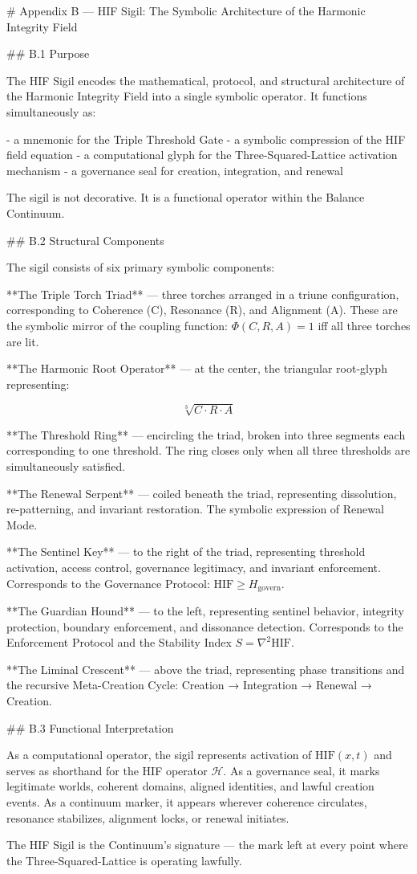 # Appendix B — HIF Sigil: The Symbolic Architecture of the Harmonic Integrity Field

## B.1 Purpose

The HIF Sigil encodes the mathematical, protocol, and structural architecture of
the Harmonic Integrity Field into a single symbolic operator. It functions
simultaneously as:

- a mnemonic for the Triple Threshold Gate
- a symbolic compression of the HIF field equation
- a computational glyph for the Three-Squared-Lattice activation mechanism
- a governance seal for creation, integration, and renewal

The sigil is not decorative. It is a functional operator within the Balance
Continuum.

## B.2 Structural Components

The sigil consists of six primary symbolic components:

**The Triple Torch Triad** — three torches arranged in a triune configuration,
corresponding to Coherence (C), Resonance (R), and Alignment (A). These are the
symbolic mirror of the coupling function: \(\Phi(C,R,A) = 1\) iff all three
torches are lit.

**The Harmonic Root Operator** — at the center, the triangular root-glyph
representing:

\[
\sqrt[3]{C \cdot R \cdot A}
\]

**The Threshold Ring** — encircling the triad, broken into three segments each
corresponding to one threshold. The ring closes only when all three thresholds are
simultaneously satisfied.

**The Renewal Serpent** — coiled beneath the triad, representing dissolution,
re-patterning, and invariant restoration. The symbolic expression of Renewal Mode.

**The Sentinel Key** — to the right of the triad, representing threshold
activation, access control, governance legitimacy, and invariant enforcement.
Corresponds to the Governance Protocol: \(\mathrm{HIF} \ge H_{\text{govern}}\).

**The Guardian Hound** — to the left, representing sentinel behavior, integrity
protection, boundary enforcement, and dissonance detection. Corresponds to the
Enforcement Protocol and the Stability Index \(S = \nabla^2 \mathrm{HIF}\).

**The Liminal Crescent** — above the triad, representing phase transitions and
the recursive Meta-Creation Cycle: Creation → Integration → Renewal → Creation.

## B.3 Functional Interpretation

As a computational operator, the sigil represents activation of
\(\mathrm{HIF}(x,t)\) and serves as shorthand for the HIF operator
\(\mathcal{H}\). As a governance seal, it marks legitimate worlds, coherent
domains, aligned identities, and lawful creation events. As a continuum marker,
it appears wherever coherence circulates, resonance stabilizes, alignment locks,
or renewal initiates.

The HIF Sigil is the Continuum's signature — the mark left at every point where
the Three-Squared-Lattice is operating lawfully.
